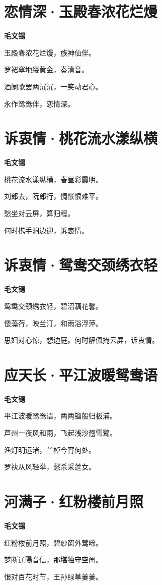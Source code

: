\documentclass[12pt,a4paper]{ctexbook}
\begin{document}
\section{恋情深·玉殿春浓花烂熳}
\textbf{毛文锡}\par\vspace{0.5em}
玉殿春浓花烂熳，族神仙伴。\par
罗裙窣地缕黄金，奏清音。\par
酒阑歌罢两沉沉，一笑动君心。\par
永作鸳鸯伴，恋情深。\par

\section{诉衷情·桃花流水漾纵横}
\textbf{毛文锡}\par\vspace{0.5em}
桃花流水漾纵横，春昼彩霞明。\par
刘郎去，阮郎行，惆怅恨难平。\par
愁坐对云屏，算归程。\par
何时携手洞边迎，诉衷情。\par

\section{诉衷情·鸳鸯交颈绣衣轻}
\textbf{毛文锡}\par\vspace{0.5em}
鸳鸯交颈绣衣轻，碧沼藕花馨。\par
偎藻荇，映兰汀，和雨浴浮萍。\par
思妇对心惊，想边庭。何时解佩掩云屏，诉衷情。\par

\section{应天长·平江波暖鸳鸯语}
\textbf{毛文锡}\par\vspace{0.5em}
平江波暖鸳鸯语，两两镏般归极浦。\par
芦州一夜风和雨，飞起浅沙翘雪鹭。\par
渔灯明远渚，兰棹今宵何处。\par
罗袂从风轻举，愁杀采莲女。\par

\section{河满子·红粉楼前月照}
\textbf{毛文锡}\par\vspace{0.5em}
红粉楼前月照，碧纱窗外莺啼。\par
梦断辽陽音信，那堪独守空闺。\par
恨对百花时节，王孙绿草萋萋。\par
\end{document}
